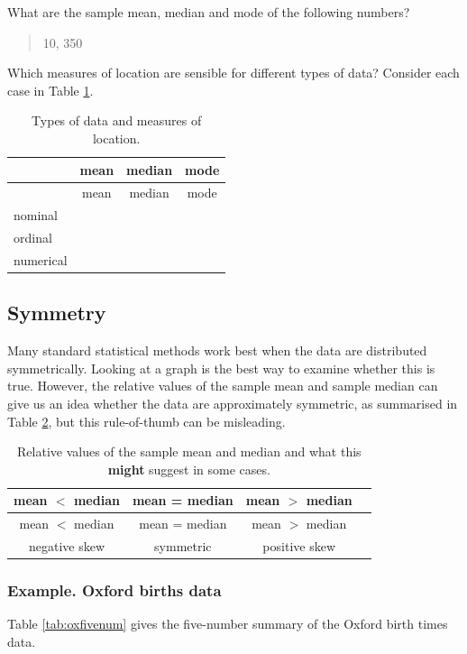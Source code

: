 \documentclass[
  british,
]{book}
\begin{document}
What are the sample mean, median and mode of the following numbers?

\begin{quote}
10, 350
\end{quote}

Which measures of location are sensible for different types of data? Consider each case in Table \ref{tab:whichmeasures}.

\begin{longtable}[]{@{}lccc@{}}
\caption{\label{tab:whichmeasures} Types of data and measures of location.}\tabularnewline
\toprule
& mean & median & mode\tabularnewline
\midrule
\endfirsthead
\toprule
& mean & median & mode\tabularnewline
\midrule
\endhead
nominal & & &\tabularnewline
ordinal & & &\tabularnewline
numerical & & &\tabularnewline
\bottomrule
\end{longtable}

\hypertarget{symmetry}{%
\subsection{Symmetry}\label{symmetry}}

Many standard statistical methods work best when the data are distributed symmetrically. Looking at a graph is the best way to examine whether this is true. However, the relative values of the sample mean and sample median can give us an idea whether the data are approximately symmetric, as summarised in Table \ref{tab:thumb}, but this rule-of-thumb can be misleading.

\begin{longtable}[]{@{}cccc@{}}
\caption{\label{tab:thumb} Relative values of the sample mean and median and what this \textbf{might} suggest in some cases.}\tabularnewline
\toprule
mean \(<\) median & mean = median & mean \(>\) median &\tabularnewline
\midrule
\endfirsthead
\toprule
mean \(<\) median & mean = median & mean \(>\) median &\tabularnewline
\midrule
\endhead
negative skew & symmetric & positive skew &\tabularnewline
\bottomrule
\end{longtable}

\hypertarget{example.-oxford-births-data}{%
\subsubsection*{Example. Oxford births data}\label{example.-oxford-births-data}}

Table \ref{tab:oxfivenum} gives the five-number summary of the Oxford birth times data.
\end{document}
